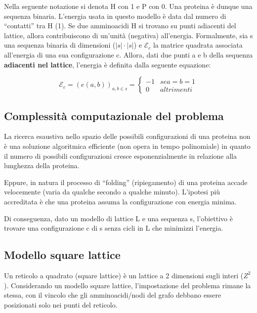 \documentclass[twocolumn,10pt]{asme2ej}
\begin{document}
Nella seguente notazione si denota H con 1 e P con 0. Una proteina è dunque una sequenza binaria. L'energia usata in questo modello è data dal numero di ``contatti'' tra H (1). Se due amminoacidi H si trovano su punti adiacenti del lattice, allora contribuiscono di un'unità (negativa) all'energia.
Formalmente, sia s una sequenza binaria di dimensioni ($|s|\cdot|s|$) e $\mathcal{E}_c$ la matrice quadrata associata all'energia di una sua configurazione c. Allora, dati due punti a e b della sequenza \textbf{adiacenti nel lattice}, l'energia è definita dalla seguente equazione:

\begin{equation}
    \mathcal{E}_c = (e(a,b))_{a,b \in s} =
    \begin{cases*}
      -1 & se a = b = 1 \\
      0  & altrimenti
    \end{cases*}
\end{equation}

\subsection{Complessità computazionale del problema}

La ricerca esaustiva nello spazio delle possibili configurazioni di una proteina non è una soluzione algoritmica efficiente (non opera in tempo polinomiale) in quanto il numero di possibili configurazioni cresce esponenzialmente in relazione alla lunghezza della proteina.

Eppure, in natura il processo di ``folding'' (ripiegamento) di una proteina accade velocemente (varia da qualche secondo a qualche minuto). L'ipotesi più accreditata è che una proteina assuma la configurazione con energia minima.

Di conseguenza, dato un modello di lattice L e una sequenza s, l'obiettivo è trovare una configurazione c di s senza cicli in L che minimizzi l'energia.

\subsection{Modello square lattice}

Un reticolo a quadrato (square lattice) è un lattice a 2 dimensioni sugli interi ($Z^2$). Considerando un modello square lattice, l'impostazione del problema rimane la stessa, con il vincolo che gli amminoacidi/nodi del grafo debbano essere posizionati solo nei punti del reticolo.
\end{document}
